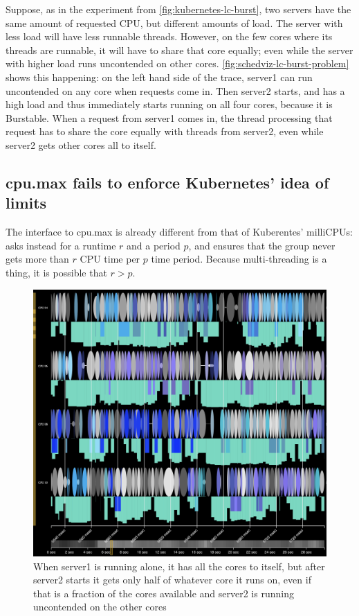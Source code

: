 Suppose, as in the experiment from \autoref{fig:kubernetes-lc-burst}, two
servers have the same amount of requested CPU, but different amounts of load.
The server with less load will have less runnable threads. However, on the few
cores where its threads are runnable, it will have to share that core equally;
even while the server with higher load runs uncontended on other cores.
\autoref{fig:schedviz-lc-burst-problem} shows this happening: on the left hand
side of the trace, server1 can run uncontended on any core when requests come
in. Then server2 starts, and has a high load and thus immediately starts running
on all four cores, because it is Burstable. When a request from server1 comes
in, the thread processing that request has to share the core equally with
threads from server2, even while server2 gets other cores all to itself.



\subsection{\cgroups{} cpu.max fails to enforce Kubernetes' idea of limits}


The interface to \cgroups{} cpu.max is already different from that of
Kuberentes' milliCPUs: \cgroups{} asks instead for a runtime $r$ and a period
$p$, and ensures that the group never gets more than $r$ CPU time per $p$ time
period. Because multi-threading is a thing, it is possible that $r>p$. 

\begin{figure}[t]
    \centering
    \includegraphics[width=\columnwidth]{graphs/schedviz-lc-guar-problem.png}
    \caption{When server1 is running alone, it has all the cores to itself, but
    after server2 starts it gets only half of whatever core it runs on, even if
    that is a fraction of the cores available and server2 is running uncontended
    on the other cores}\label{fig:schedviz-lc-guar-problem}
\end{figure}

